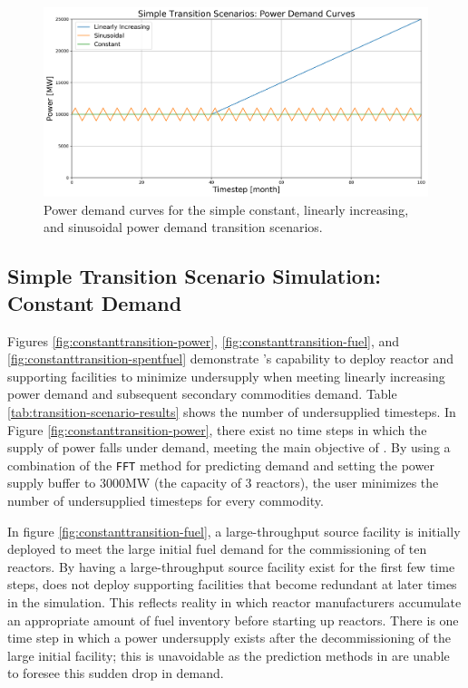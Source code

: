     \begin{figure}[]
        \begin{center}
            \includegraphics[scale=0.45]{./figures/powerplots.png}
        \end{center}
            \caption{Power demand curves for the simple constant, 
            linearly increasing, and sinusoidal power demand 
            transition scenarios.}
        \label{fig:powerplots}
    \end{figure}

\subsection{Simple Transition Scenario Simulation: Constant Demand}
Figures \ref{fig:constanttransition-power}, \ref{fig:constanttransition-fuel},
and \ref{fig:constanttransition-spentfuel} demonstrate \deploy's capability 
to deploy reactor and supporting facilities to minimize undersupply 
when meeting linearly increasing power demand and subsequent secondary 
commodities demand.  
Table \ref{tab:transition-scenario-results} shows the number of 
undersupplied timesteps. 
In Figure \ref{fig:constanttransition-power}, there exist no time steps 
in which the supply of power falls under demand, meeting the main 
objective of \deploy. 
By using a combination of the \texttt{FFT} method for 
predicting demand and setting the power supply buffer to 3000MW 
(the capacity of 3 reactors), the user minimizes the number of 
undersupplied timesteps for every commodity.

In figure \ref{fig:constanttransition-fuel},
a large-throughput source facility is initially
deployed to meet the large initial fuel demand for the commissioning 
of ten reactors. 
By having a large-throughput source facility exist for the 
first few time steps, \deploy does not deploy supporting
facilities that become redundant at later times in  
the simulation.
This reflects reality in which reactor manufacturers accumulate
an appropriate amount of fuel inventory before starting 
up reactors. 
There is one time step in which a power undersupply exists after the 
decommissioning of the large initial facility; 
this is unavoidable as the prediction methods in \deploy are 
unable to foresee this sudden drop in demand. 

